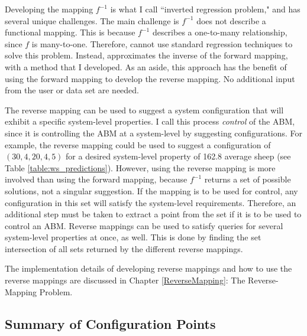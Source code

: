 Developing the mapping $f^{-1}$ is what I call ``inverted regression problem," and has several unique challenges.
The main challenge is $f^{-1}$ does not describe a functional mapping.
This is because $f^{-1}$ describes a one-to-many relationship, since $f$ is many-to-one.
Therefore, \fw cannot use standard regression techniques to solve this problem.
Instead, \fw approximates the inverse of the forward mapping, with a method that I developed.
As an aside, this approach has the benefit of using the forward mapping to develop the reverse mapping.
No additional input from the user or data set are needed.

The reverse mapping can be used to suggest a system configuration that will exhibit a specific system-level properties.
I call this process \textit{control} of the ABM, since it is controlling the ABM at a system-level by suggesting configurations.
For example, the reverse mapping could be used to suggest a configuration of $(30, 4, 20, 4, 5)$  for a desired system-level property of 162.8 average sheep (see Table \ref{table:ws_predictions}).
However, using the reverse mapping is more involved than using the forward mapping, because $f^{-1}$ returns a set of possible solutions, not a singular suggestion.
If the mapping is to be used for control, any configuration in this set will satisfy the system-level requirements.
Therefore, an additional step must be taken to extract a point from the set if it is to be used to control an ABM.
Reverse mappings can be used to satisfy queries for several system-level properties at once, as well.
This is done by finding the set intersection of all sets returned by the different reverse mappings.

The implementation details of developing reverse mappings and how to use the reverse mappings are discussed in Chapter \ref{ReverseMapping}: The Reverse-Mapping Problem.





\subsection{Summary of Configuration Points}

